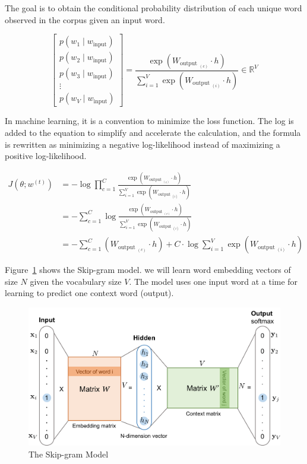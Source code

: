 The goal is to obtain the conditional probability distribution of each unique word observed in the corpus given an input word.

\begin{equation}
    \left[\begin{array}{c}
    p\left(w_{1} \mid w_{\text {input}}\right) \\
    p\left(w_{2} \mid w_{\text {input}}\right) \\
    p\left(w_{3} \mid w_{\text {input}}\right) \\
    \vdots \\
    p\left(w_{V} \mid w_{\text {input}}\right)
    \end{array}\right]=\frac{\exp \left(W_{\text {output }_{(c)}} \cdot h\right)}{\sum_{i=1}^{V} \exp \left(W_{\text {output }_{(i)}} \cdot h\right)} \in \mathbb{R}^{V}
\end{equation}

In machine learning, it is a convention to minimize the loss function. The log is added to the equation to simplify and accelerate the calculation, and the formula is rewritten as minimizing a negative log-likelihood instead of maximizing a positive log-likelihood.

\begin{align}
J\left(\theta ; w^{(t)}\right)&=-\log \prod_{c=1}^{C} \frac{\exp \left(W_{\text {output }_{(c)}} \cdot h\right)}{\sum_{i=1}^{V} \exp \left(W_{\text {output }_{(i)}} \cdot h\right)} \\
&=-\sum_{c=1}^{C} \log \frac{\exp \left(W_{\text {output }_{(c)}} \cdot h\right)}{\sum_{i=1}^{V} \exp \left(W_{\text {output }_{(i)}} \cdot h\right)} \\
&=-\sum_{c=1}^{C}\left(W_{\text {output }_{(c)}} \cdot h\right)+C \cdot \log \sum_{i=1}^{V} \exp \left(W_{\text {output }_{(i)}} \cdot h\right)
\end{align}

Figure~\ref{fig:skip-gram} shows the Skip-gram model. we will learn word embedding vectors of size $N$ given the vocabulary size $V$. The model uses one input word at a time for learning to predict one context word (output).

\begin{figure}[h]
	\centering
	\includegraphics[scale=0.4]{../images/skip-gram.png}
    \caption[The Skip-gram Model]{The Skip-gram Model\protect\footnotemark}
	\label{fig:skip-gram}
\end{figure}

